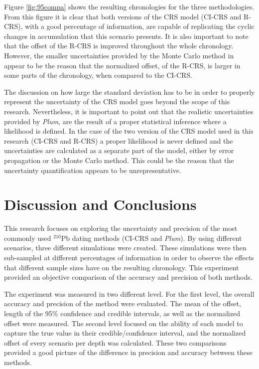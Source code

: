 \documentclass [10pt] {article}
\begin{document}
Figure \ref{fig:95compa} shows the resulting chronologies for the three methodologies.
From this figure it is clear that both versions of the CRS model (CI-CRS and R-CRS), with a good percentage of information, are capable of replicating the cyclic changes in accumulation that this scenario presents.
It is also important to note that the offset of the R-CRS is improved throughout the whole chronology. 
However, the smaller uncertainties provided by the Monte Carlo method in \citet{Sanchez-Cabeza2014} appear to be the reason that the normalized offset, of the R-CRS, is larger in some parts of the chronology, when compared to the CI-CRS. 

The discussion on how large the standard deviation has to be in order to properly represent the uncertainty of the CRS model goes beyond the scope of this research.
Nevertheless, it is important to point out that the realistic uncertainties provided by \textit{Plum}, are the result of a proper statistical inference where a likelihood is defined.
In the case of the two version of the CRS model used in this research (CI-CRS and R-CRS) a proper likelihood is never defined and the uncertainties are calculated as a separate part of the model, either by error propagation or the Monte Carlo method.
This could be the reason that the uncertainty quantification appears to be unrepresentative.






\section{Discussion and Conclusions}

This research focuses on exploring the uncertainty and precision of the most commonly used $^{210}$Pb dating methods (CI-CRS and \textit{Plum}).
By using different scenarios, three different simulations were created.
These simulations were then sub-sampled at different percentages of information in order to observe the effects that different sample sizes have on the resulting chronology. 
This experiment provided an objective comparison of the accuracy and precision of both methods.

The experiment was measured in two different level.
For the first level, the overall accuracy and precision of the method were evaluated.
The mean of the offset, length of the 95\% confidence and credible intervals, as well as the normalized offset were measured.
The second level focused on the ability of each model to capture the true value in their credible/confidence interval, and the normalized offset of every scenario per depth was calculated. 
These two comparisons provided a good picture of the difference in precision and accuracy between these methods.
\end{document}
